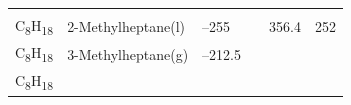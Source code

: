 \documentclass[
  9pt,
]{extbook}
\theoremstyle{definition}
\theoremstyle{definition}
\theoremstyle{definition}
\theoremstyle{remark}
\begin{document}
\begin{longtable}[]{@{}llllll@{}}
\begin{minipage}[t]{0.15\columnwidth}
\strut
\end{minipage} & \begin{minipage}[t]{0.14\columnwidth}\raggedright
\strut
\end{minipage} & \begin{minipage}[t]{0.14\columnwidth}\raggedright
\strut
\end{minipage}\tabularnewline
\begin{minipage}[t]{0.07\columnwidth}\raggedright
C\textsubscript{8}H\textsubscript{18}\strut
\end{minipage} & \begin{minipage}[t]{0.17\columnwidth}\raggedright
2-Methylheptane(l)\strut
\end{minipage} & \begin{minipage}[t]{0.15\columnwidth}\raggedright
--255\strut
\end{minipage} & \begin{minipage}[t]{0.15\columnwidth}\raggedright
\strut
\end{minipage} & \begin{minipage}[t]{0.14\columnwidth}\raggedright
356.4\strut
\end{minipage} & \begin{minipage}[t]{0.14\columnwidth}\raggedright
252\strut
\end{minipage}\tabularnewline
\begin{minipage}[t]{0.07\columnwidth}\raggedright
C\textsubscript{8}H\textsubscript{18}\strut
\end{minipage} & \begin{minipage}[t]{0.17\columnwidth}\raggedright
3-Methylheptane(g)\strut
\end{minipage} & \begin{minipage}[t]{0.15\columnwidth}\raggedright
--212.5\strut
\end{minipage} & \begin{minipage}[t]{0.15\columnwidth}\raggedright
\strut
\end{minipage} & \begin{minipage}[t]{0.14\columnwidth}\raggedright
\strut
\end{minipage} & \begin{minipage}[t]{0.14\columnwidth}\raggedright
\strut
\end{minipage}\tabularnewline
\begin{minipage}[t]{0.07\columnwidth}\raggedright
C\textsubscript{8}H\textsubscript{18}\strut
\end{minipage} & \begin{minipage}[t]{0.17\columnwidth}\raggedright

\end{minipage}
\end{longtable}
\end{document}
